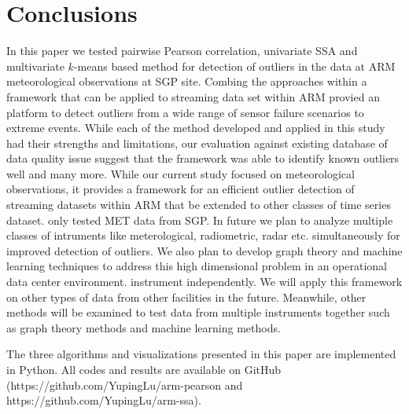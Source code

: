 \section{Conclusions}
In this paper we tested pairwise Pearson correlation,
univariate SSA and multivariate $k$-means based method for detection of
outliers in the data at ARM meteorological observations at SGP site. 
Combing the approaches within a framework that can be applied to
streaming data set within ARM provied an platform to detect outliers
from a wide range of sensor failure scenarios to extreme events.
While each of the method developed and applied in this study had their
strengths and limitations, our evaluation against existing database of
data quality issue suggest that the framework was able to identify known
outliers well and many more. While our current study focused on
meteorological observations, it provides a framework for an efficient
outlier detection of streaming datasets within ARM that be extended to
other classes of time series dataset.
only tested MET data from SGP. In future we plan to analyze multiple
classes of intruments like meterological, radiometric, radar etc.
simultaneously for improved detection of outliers. We also plan to
develop graph theory and machine learning techniques to address this
high dimensional problem in an operational data center environment. 
instrument independently. We will apply this framework on other types
of data from other facilities in the future. Meanwhile, other methods
will be examined to test data from multiple instruments together such
as graph theory methods \cite{phillips2015graph} and machine learning
methods. 


The three algorithms and visualizations presented in this paper are 
implemented in Python. All codes and results are available on GitHub 
(https://github.com/YupingLu/arm-pearson and https://github.com/YupingLu/arm-ssa). 
